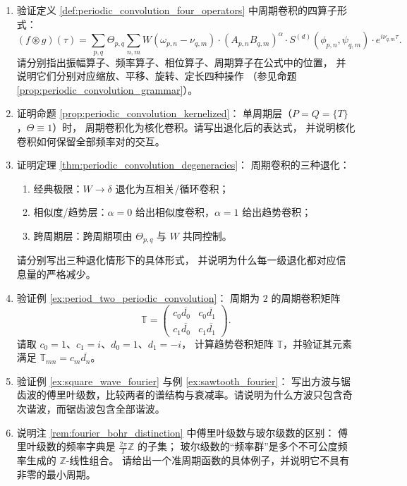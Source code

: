 \begin{enumerate}[leftmargin=3em, label=\textbf{题 \arabic*}]
    \item 验证定义 \ref{def:periodic_convolution_four_operators} 中周期卷积的四算子形式：
    \[
    (f\circledast g)(\tau)
    =\sum_{p,q}\Theta_{p,q}\sum_{n,m}
    W(\omega_{p,n}-\nu_{q,m})\cdot(A_{p,n}B_{q,m})^{\alpha}
    \cdot S^{(d)}(\phi_{p,n},\psi_{q,m})\cdot e^{i\nu_{q,m}\tau}.
    \]
    请分别指出振幅算子、频率算子、相位算子、周期算子在公式中的位置，
    并说明它们分别对应缩放、平移、旋转、定长四种操作
    （参见命题 \ref{prop:periodic_convolution_grammar}）。

    \item 证明命题 \ref{prop:periodic_convolution_kernelized}：
    单周期层（$P=Q=\{T\}$，$\Theta\equiv1$）时，
    周期卷积化为核化卷积。请写出退化后的表达式，
    并说明核化卷积如何保留全部频率对的交互。

    \item 证明定理 \ref{thm:periodic_convolution_degeneracies}：
    周期卷积的三种退化：
    \begin{enumerate}[label=(\roman*)]
        \item 经典极限：$W\to\delta$ 退化为互相关/循环卷积；
        \item 相似度/趋势层：$\alpha=0$ 给出相似度卷积，$\alpha=1$ 给出趋势卷积；
        \item 跨周期层：跨周期项由 $\Theta_{p,q}$ 与 $W$ 共同控制。
    \end{enumerate}
    请分别写出三种退化情形下的具体形式，
    并说明为什么每一级退化都对应信息量的严格减少。

    \item 验证例 \ref{ex:period_two_periodic_convolution}：
    周期为 $2$ 的周期卷积矩阵
    \[
    \mathbb{T}=\begin{pmatrix}
    c_0\overline{d_0}&c_0\overline{d_1}\\
    c_1\overline{d_0}&c_1\overline{d_1}
    \end{pmatrix}.
    \]
    请取 $c_0=1$、$c_1=i$、$d_0=1$、$d_1=-i$，
    计算趋势卷积矩阵 $\mathbb{T}$，并验证其元素满足
    $\mathbb{T}_{mn}=c_m\overline{d_n}$。

    \item 验证例 \ref{ex:square_wave_fourier} 与例 \ref{ex:sawtooth_fourier}：
    写出方波与锯齿波的傅里叶级数，比较两者的谱结构与衰减率。请说明为什么方波只包含奇次谐波，而锯齿波包含全部谐波。

    \item 说明注 \ref{rem:fourier_bohr_distinction} 中傅里叶级数与玻尔级数的区别：
    傅里叶级数的频率字典是 $\frac{2\pi}{T}\mathbb{Z}$ 的子集；
    玻尔级数的“频率群”是多个不可公度频率生成的 $\mathbb{Z}$-线性组合。
    请给出一个准周期函数的具体例子，并说明它不具有非零的最小周期。


\end{enumerate}
